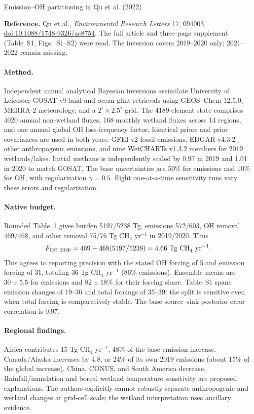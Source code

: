 \documentclass[11pt]{article}
\begin{document}
\begin{center}\large Emission--OH partitioning in Qu et al. (2022)\end{center}
\noindent\textbf{Reference.} Qu et al., \emph{Environmental Research Letters}
17, 094003, \href{https://doi.org/10.1088/1748-9326/ac8754}{doi:10.1088/1748-9326/ac8754}.
The full article and three-page supplement (Table~S1, Figs.~S1--S2) were read.
The inversion covers 2019--2020 only; 2021--2022 remain missing.

\paragraph{Method.} Independent annual analytical Bayesian inversions assimilate
University of Leicester GOSAT v9 land and ocean-glint retrievals using
GEOS--Chem 12.5.0, MERRA-2 meteorology, and a $2^\circ\times2.5^\circ$ grid.
The 4189-element state comprises 4020 annual non-wetland fluxes, 168 monthly
wetland fluxes across 14 regions, and one annual global OH loss-frequency
factor. Identical priors and prior covariances are used in both years:
GFEI v2 fossil emissions, EDGAR v4.3.2 other anthropogenic emissions,
and nine WetCHARTs v1.3.2 members for 2019 wetlands/lakes. Initial methane
is independently scaled by 0.97 in 2019 and 1.01 in 2020 to match GOSAT.
The base uncertainties are 50\% for emissions and 10\% for OH, with
regularization $\gamma=0.5$. Eight one-at-a-time sensitivity runs vary
these errors and regularization.

\paragraph{Native budget.} Rounded Table~1 gives burden 5197/5238 Tg,
emissions 572/603, OH removal 469/468, and other removal 75/76
Tg CH$_4$ yr$^{-1}$ in 2019/2020. Thus
\begin{equation}
F_{{\rm OH},2020}=469-468(5197/5238)=4.66\ {\rm Tg\ CH}_4\ {\rm yr}^{-1}.
\end{equation}
This agrees to reporting precision with the stated OH forcing of 5 and
emission forcing of 31, totaling 36 Tg CH$_4$ yr$^{-1}$ (86\% emissions).
Ensemble means are $30\pm5.5$ for emissions and $82\pm18$\% for their
forcing share. Table~S1 spans emission changes of 19--36 and total forcings
of 35--39: the split is sensitive even when total forcing is comparatively
stable. The base source--sink posterior error correlation is 0.97.

\paragraph{Regional findings.} Africa contributes 15 Tg CH$_4$ yr$^{-1}$,
48\% of the base emission increase. Canada/Alaska increases by 4.8,
or 24\% of its own 2019 emissions (about 15\% of the global increase).
China, CONUS, and South America decrease. Rainfall/inundation and boreal
wetland temperature sensitivity are proposed explanations. The authors
explicitly cannot robustly separate anthropogenic and wetland changes at
grid-cell scale; the wetland interpretation uses ancillary evidence.
\end{document}
